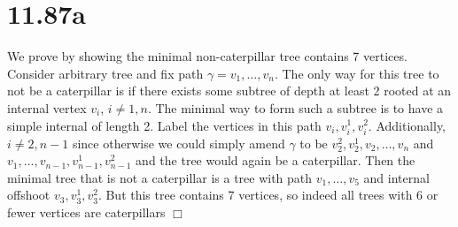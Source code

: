 \documentclass{article}
\begin{document}
\begin{center}
\end{center}

\section*{11.87a}
We prove by showing the minimal non-caterpillar tree contains 7 vertices. Consider arbitrary tree and fix path $\gamma = v_1, \dots, v_n$. The only way for this tree to not be a caterpillar is if there exists some subtree of depth at least 2 rooted at an internal vertex $v_i$, $i \neq 1, n$. The minimal way to form such a subtree is to have a simple internal  of length 2. Label the vertices in this path $v_i, v_i^1, v_i^2$. Additionally, $i \neq 2, n-1$ since otherwise we could simply amend $\gamma$ to be $v_2^2, v_2^1, v_2, \dots, v_n$ and $v_1, \dots, v_{n-1}, v_{n-1}^1, v_{n-1}^2$ and the tree would again be a caterpillar. Then the minimal tree that is not a caterpillar is a tree with path $v_1, \dots, v_5$ and internal offshoot $v_3, v_3^1, v_3^2$. But this tree contains 7 vertices, so indeed all trees with 6 or fewer vertices are caterpillars $\Box$
\end{document}
